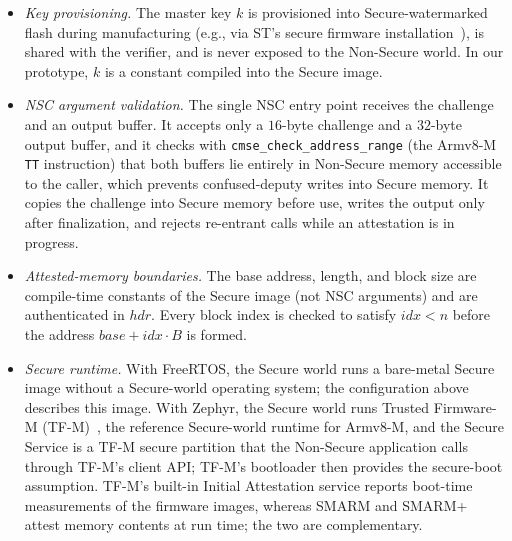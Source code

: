\documentclass[journal]{IEEEtran}
\newcommand{\rtsmarm}{SMARM+\xspace}
\begin{document}
{\begin{itemize}
  We assume this configuration in deployment; our measurements were taken at RDP level~$0$ to allow debugging, which does not affect runtime.
  \item \emph{Key provisioning.} The master key $k$ is provisioned into Secure-watermarked flash during manufacturing (e.g., via ST's secure firmware installation~\cite{an5347}), is shared with the verifier, and is never exposed to the Non-Secure world.
  In our prototype, $k$ is a constant compiled into the Secure image.
  \item \emph{NSC argument validation.} The single NSC entry point receives the challenge and an output buffer.
  It accepts only a $16$-byte challenge and a $32$-byte output buffer, and it checks with \texttt{cmse\_check\_address\_range} (the Armv8-M \texttt{TT} instruction) that both buffers lie entirely in Non-Secure memory accessible to the caller, which prevents confused-deputy writes into Secure memory.
  It copies the challenge into Secure memory before use, writes the output only after finalization, and rejects re-entrant calls while an attestation is in progress.
  \item \emph{Attested-memory boundaries.} The base address, length, and block size are compile-time constants of the Secure image (not NSC arguments) and are authenticated in $\mathit{hdr}$.
  Every block index is checked to satisfy $idx < n$ before the address $\mathit{base} + idx \cdot B$ is formed.
  \item \emph{Secure runtime.} With FreeRTOS, the Secure world runs a bare-metal Secure image without a Secure-world operating system; the configuration above describes this image.
  With Zephyr, the Secure world runs Trusted Firmware-M (TF-M)~\cite{tfm}, the reference Secure-world runtime for Armv8-M, and the Secure Service is a TF-M secure partition that the Non-Secure application calls through TF-M's client API; TF-M's bootloader then provides the secure-boot assumption.
  TF-M's built-in Initial Attestation service reports boot-time measurements of the firmware images, whereas SMARM and \rtsmarm attest memory contents at run time; the two are complementary.

\end{itemize}}
\end{document}
